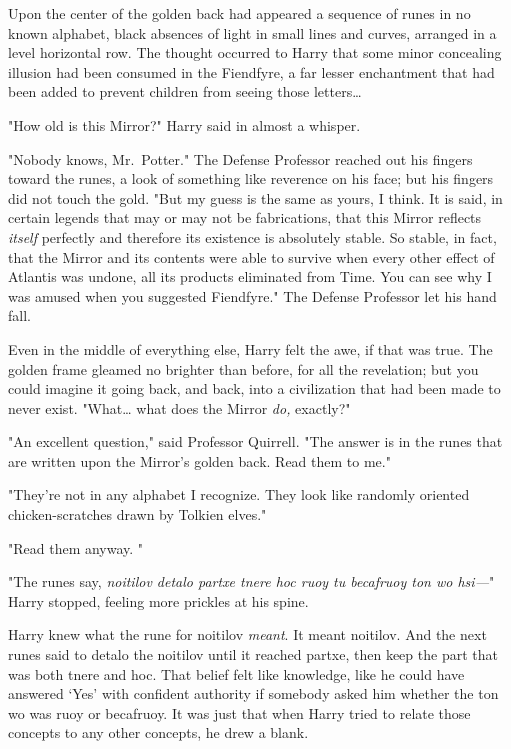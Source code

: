 Upon the center of the golden back had appeared a sequence of runes in no known 
alphabet, black absences of light in small lines and curves, arranged in a 
level horizontal row. The thought occurred to Harry that some minor concealing 
illusion had been consumed in the Fiendfyre, a far lesser enchantment that had 
been added to prevent children from seeing those letters{\ldots}

"How old is this Mirror?" Harry said in almost a whisper.

"Nobody knows, Mr.~Potter." The Defense Professor reached out his fingers 
toward the runes, a look of something like reverence on his face; but his 
fingers did not touch the gold. "But my guess is the same as yours, I think. It 
is said, in certain legends that may or may not be fabrications, that this 
Mirror reflects \emph{itself} perfectly and therefore its existence is 
absolutely stable. So stable, in fact, that the Mirror and its contents were 
able to survive when every other effect of Atlantis was undone, all its 
products eliminated from Time. You can see why I was amused when you suggested 
Fiendfyre." The Defense Professor let his hand fall.

Even in the middle of everything else, Harry felt the awe, if that was true. 
The golden frame gleamed no brighter than before, for all the revelation; but 
you could imagine it going back, and back, into a civilization that had been 
made to never exist. "What{\ldots} what does the Mirror \emph{do,} exactly?"

"An excellent question," said Professor Quirrell. "The answer is in the runes 
that are written upon the Mirror's golden back. Read them to me."

"They're not in any alphabet I recognize. They look like randomly oriented 
chicken-scratches drawn by Tolkien elves."

"Read them anyway. "

"The runes say, \emph{noitilov detalo partxe tnere hoc ruoy tu becafruoy ton wo 
hsi---}" Harry stopped, feeling more prickles at his spine.

Harry knew what the rune for noitilov \emph{meant}. It meant noitilov. And the 
next runes said to detalo the noitilov until it reached partxe, then keep the 
part that was both tnere and hoc. That belief felt like knowledge, like he could 
have answered `Yes' with confident authority if somebody asked him 
whether the ton wo was ruoy or becafruoy. It was just that when Harry tried to 
relate those concepts to any other concepts, he drew a blank.

